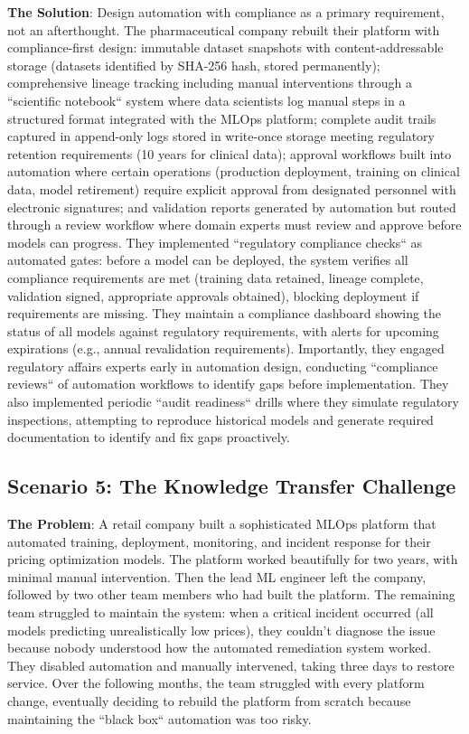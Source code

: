 \textbf{The Solution}: Design automation with compliance as a primary requirement, not an afterthought. The pharmaceutical company rebuilt their platform with compliance-first design: immutable dataset snapshots with content-addressable storage (datasets identified by SHA-256 hash, stored permanently); comprehensive lineage tracking including manual interventions through a ``scientific notebook`` system where data scientists log manual steps in a structured format integrated with the MLOps platform; complete audit trails captured in append-only logs stored in write-once storage meeting regulatory retention requirements (10 years for clinical data); approval workflows built into automation where certain operations (production deployment, training on clinical data, model retirement) require explicit approval from designated personnel with electronic signatures; and validation reports generated by automation but routed through a review workflow where domain experts must review and approve before models can progress. They implemented ``regulatory compliance checks`` as automated gates: before a model can be deployed, the system verifies all compliance requirements are met (training data retained, lineage complete, validation signed, appropriate approvals obtained), blocking deployment if requirements are missing. They maintain a compliance dashboard showing the status of all models against regulatory requirements, with alerts for upcoming expirations (e.g., annual revalidation requirements). Importantly, they engaged regulatory affairs experts early in automation design, conducting ``compliance reviews`` of automation workflows to identify gaps before implementation. They also implemented periodic ``audit readiness`` drills where they simulate regulatory inspections, attempting to reproduce historical models and generate required documentation to identify and fix gaps proactively.

\subsection{Scenario 5: The Knowledge Transfer Challenge}

\textbf{The Problem}: A retail company built a sophisticated MLOps platform that automated training, deployment, monitoring, and incident response for their pricing optimization models. The platform worked beautifully for two years, with minimal manual intervention. Then the lead ML engineer left the company, followed by two other team members who had built the platform. The remaining team struggled to maintain the system: when a critical incident occurred (all models predicting unrealistically low prices), they couldn't diagnose the issue because nobody understood how the automated remediation system worked. They disabled automation and manually intervened, taking three days to restore service. Over the following months, the team struggled with every platform change, eventually deciding to rebuild the platform from scratch because maintaining the ``black box`` automation was too risky.

